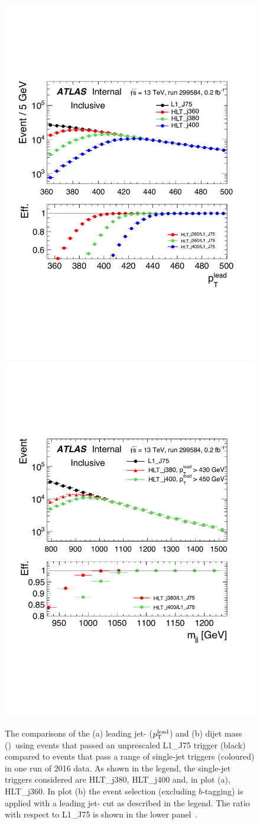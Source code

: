 \begin{figure}[!ht]
  \begin{center}
    \captionsetup[subfigure]{aboveskip=0pt,justification=centering}
    \hspace{-2mm}
     {\includegraphics[width=0.47\linewidth, angle=0]{figs/Dibjet/ICHEP/evt-jet_pt.pdf}}
    \subcaptionbox{\mjj}                   {\includegraphics[width=0.46\linewidth, angle=0]{figs/Dibjet/ICHEP/evt-mjj.pdf}}
  \end{center}
  \vspace{-1em}
  \caption[Derivations of the leading jet-\pT{} and \mjj{} cuts for the \summer{} data-set event selection using events that pass an
            unprescaled L1\_J75 trigger  compared to events that pass a range of single-jet triggers (coloured) in one run of 2016 data.]
          {The comparisons of the (a) leading jet-\pT{} ($p_{\mathrm{T}}^{\text{lead}}$) and (b) dijet mass (\mjj{})~using events that passed an
            unprescaled L1\_J75 trigger (black) compared to events that pass a range of single-jet triggers (coloured) in one run of 2016 data.
            As shown in the legend, the single-jet triggers considered are HLT\_j380, HLT\_j400 and, in plot (a), HLT\_j360.
            In plot (b) the \summer{} event selection (excluding $b$-tagging) is applied with a leading jet-\pT{} cut as described in the legend.
            The ratio with respect to L1\_J75 is shown in the lower panel~\cite{dibjet-ichep_conf}.}
     \label{fig:evt-ICHEP_turnon}
\end{figure}

